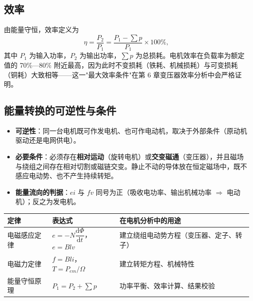 \subsection{效率}
由能量守恒，效率定义为
\begin{equation}
\eta=\frac{P_2}{P_1}=\frac{P_1-\sum p}{P_1}\times100\%,
\end{equation}
其中 $P_1$ 为输入功率，$P_2$ 为输出功率，$\sum p$ 为总损耗。电机效率在负载率为额定值的 70\%—80\% 附近最高，因为此时不变损耗（铁耗、机械损耗）与可变损耗（铜耗）大致相等——这一"最大效率条件"在第 6 章变压器效率分析中会严格证明。

\subsection{能量转换的可逆性与条件}
\begin{itemize}
  \item \textbf{可逆性}：同一台电机既可作发电机、也可作电动机，取决于外部条件（原动机驱动还是电网供电）。
  \item \textbf{必要条件}：必须存在\textbf{相对运动}（旋转电机）或\textbf{交变磁通}（变压器），并且磁场与绕组之间存在相对切割或磁链交变。静止不动的导体放在恒定磁场中，既不感应电动势、也不产生持续转矩。
  \item \textbf{能量流向的判据}：$ei$ 与 $fv$ 同号为正（吸收电功率、输出机械功率 $\Rightarrow$ 电动机）；反之为发电机。
\end{itemize}


\begin{center}
\begin{tabular}{@{}lll@{}}
\toprule
定律 & 表达式 & 在电机分析中的用途 \\
\midrule
电磁感应定律 & $e=-N\dfrac{\mathrm{d}\Phi}{\mathrm{d}t}$，$e=Blv$ & 建立绕组电动势方程（变压器、定子、转子） \\
电磁力定律 & $f=Bli$，$T=P_{em}/\Omega$ & 建立转矩方程、机械特性 \\
能量守恒原理 & $P_1=P_2+\sum p$ & 功率平衡、效率计算、结果校验 \\
\bottomrule
\end{tabular}
\end{center}
